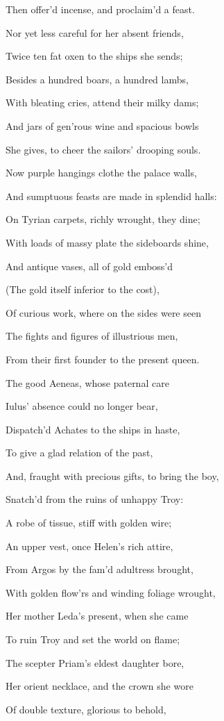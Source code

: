 Then offer’d incense, and proclaim’d a feast.

Nor yet less careful for her absent friends,

Twice ten fat oxen to the ships she sends;

Besides a hundred boars, a hundred lambs,

With bleating cries, attend their milky dams;

And jars of gen’rous wine and spacious bowls

She gives, to cheer the sailors’ drooping souls.

Now purple hangings clothe the palace walls,

And sumptuous feasts are made in splendid halls:

On Tyrian carpets, richly wrought, they dine;

With loads of massy plate the sideboards shine,

And antique vases, all of gold emboss’d

(The gold itself inferior to the cost),

Of curious work, where on the sides were seen

The fights and figures of illustrious men,

From their first founder to the present queen.

The good Aeneas, whose paternal care

Iulus’ absence could no longer bear,

Dispatch’d Achates to the ships in haste,

To give a glad relation of the past,

And, fraught with precious gifts, to bring the boy,

Snatch’d from the ruins of unhappy Troy:

A robe of tissue, stiff with golden wire;

An upper vest, once Helen’s rich attire,

From Argos by the fam’d adultress brought,

With golden flow’rs and winding foliage wrought,

Her mother Leda’s present, when she came

To ruin Troy and set the world on flame;

The scepter Priam’s eldest daughter bore,

Her orient necklace, and the crown she wore

Of double texture, glorious to behold,


